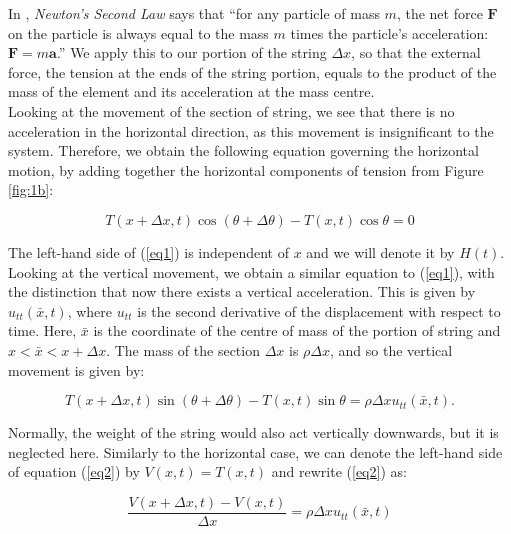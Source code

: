 \documentclass[a4paper, 12pt]{article}
\numberwithin{equation}{section}
\begin{document}
In \cite{Tay}, \emph{Newton's Second Law} says that ``for any particle of mass $m$, the net force 
$\boldsymbol{F}$ on the particle is always equal to the mass $m$ times the particle's 
acceleration: $\boldsymbol{F} = m \boldsymbol{a}$.''  We apply this to our 
portion of the string $\Delta x$, so that the external
force, the tension at the ends of the string portion, equals to the product of the mass of the element and 
its acceleration at the mass centre. 
\\

Looking at the movement of the section of string, we see that there is no acceleration in the horizontal direction,  
as this movement is insignificant to the system. Therefore, we obtain the 
following equation governing the horizontal motion, by adding together the horizontal components of tension from Figure \ref{fig:1b}:

\begin {equation} \label{eq1}
    T(x+\Delta x,t)\cos{(\theta + \Delta \theta)}-T(x,t)\cos{\theta}=0
\end {equation}

The left-hand side of (\ref{eq1}) is independent of $x$ and we will denote it by $H(t)$.
\\

Looking at the vertical movement, we obtain a similar equation to (\ref{eq1}), with the distinction
that now there exists a vertical acceleration. This is given by $u_{tt} (\bar{x},t)$, where $u_{tt}$ is the second derivative
of the displacement with respect to time. Here,
 $\bar{x}$ is the coordinate of the centre of mass of the portion of string and $x<\bar{x}<x+\Delta x$. The mass of the 
 section $\Delta x$ is $\rho\Delta x$, and so the vertical movement is given by:

 \begin{equation} \label{eq2}
    T(x+\Delta x,t)\sin{(\theta + \Delta \theta)}-T(x,t)\sin{\theta}=\rho\Delta x u_{tt} (\bar{x},t).
 \end{equation}

 Normally, the weight of the string would also act vertically downwards, but it is neglected here. Similarly to the 
 horizontal case, we can denote the left-hand side of equation (\ref{eq2}) by $V(x,t)=T(x,t)$ and rewrite (\ref{eq2})
 as:

 \begin{equation} \label{eq3}
    \frac{V(x+\Delta x,t)-V(x,t)}{\Delta x}=\rho\Delta x u_{tt} (\bar{x},t)
 \end{equation}
\end{document}
